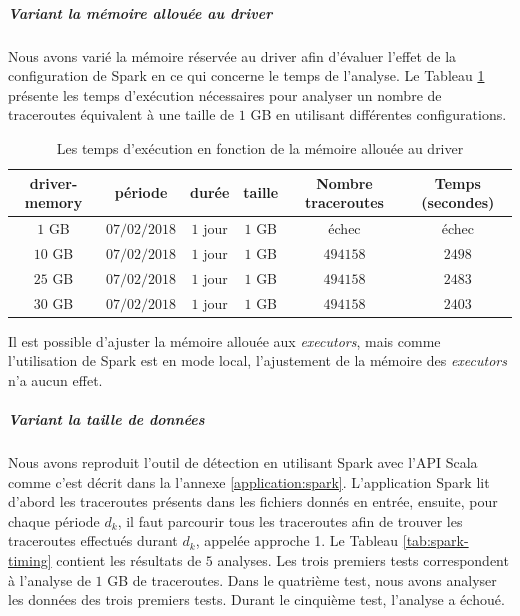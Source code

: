 \subparagraph{Variant la mémoire allouée au driver}

Nous avons varié la mémoire réservée au driver afin d'évaluer l'effet de la configuration de Spark en ce qui concerne le temps de l'analyse. Le Tableau 	\ref{tab:spark-timing-driver} présente les temps d'exécution nécessaires pour analyser un nombre de traceroutes équivalent à une taille de $ 1 $ GB en utilisant différentes configurations. 

\begin{table}[H]
	\captionsetup{justification=centering}
	\begin{tabular}{cccccc}
		\textbf{driver-memory}&	\textbf{période} &\textbf{durée}  & \textbf{taille}  & \textbf{Nombre traceroutes} & \textbf{Temps (secondes)}  \\ \hline
		$ 1 $ GB&	$ 07/02/2018 $&$ 1 $ jour&$ 1 $ GB& échec& échec \\ \hline 
		$ 10 $ GB&	$ 07/02/2018 $&$ 1 $ jour&$ 1 $ GB&$ 494158 $& $ 2498 $ %
		\\ \hline 
		$ 25 $ GB&	$ 07/02/2018 $&$ 1 $ jour&$ 1 $ GB&   $ 494158 $   & $ 2483 $ %
		\\ \hline
		
		$ 30 $ GB&	$ 07/02/2018 $&$ 1 $ jour&$ 1 $ GB&   $ 494158 $   & $ 2403 $ 
		\\ \hline
	
	\end{tabular}
	\caption{Les temps d'exécution en fonction de la mémoire allouée au driver }
	\label{tab:spark-timing-driver}
\end{table}


Il est possible  d'ajuster   la mémoire allouée aux \textit{executors}, mais comme l'utilisation de Spark est en mode local, l'ajustement de la mémoire des \textit{executors} n'a aucun effet. 


\subparagraph{Variant la taille de données}

Nous avons reproduit l'outil de détection en utilisant Spark avec l'API Scala comme c'est décrit dans la l'annexe \ref{application:spark}. L'application Spark lit d'abord les traceroutes présents dans les fichiers donnés en entrée, ensuite, pour chaque période $d_k$, il faut parcourir tous les  traceroutes afin de trouver les traceroutes effectués durant $d_k$, appelée approche 1.  Le Tableau \ref{tab:spark-timing} contient les résultats de $5$ analyses. Les trois premiers tests correspondent à l'analyse de $1$ GB de traceroutes. Dans le quatrième test, nous avons analyser les données des trois premiers tests. Durant le cinquième test, l'analyse a échoué. 

